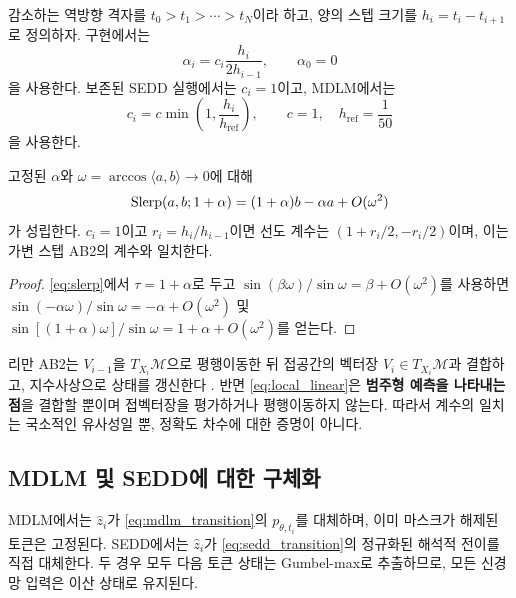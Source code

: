 감소하는 역방향 격자를 $t_0>t_1>\cdots>t_N$이라 하고, 양의 스텝 크기를
$h_i=t_i-t_{i+1}$로 정의하자. 구현에서는
\begin{equation}
  \alpha_i=c_i\frac{h_i}{2h_{i-1}},\qquad \alpha_0=0
  \label{eq:alpha}
\end{equation}
을 사용한다. 보존된 SEDD 실행에서는 $c_i=1$이고, MDLM에서는
\begin{equation}
  c_i=c\min\left(1,\frac{h_i}{h_{\mathrm{ref}}}\right),
  \qquad c=1,\quad h_{\mathrm{ref}}=\frac{1}{50}
  \label{eq:dynamic_damping}
\end{equation}
을 사용한다.

\begin{proposition}[국소 선형 형태]
고정된 $\alpha$와 $\omega=\arccos\langle a,b\rangle\rightarrow0$에 대해
\begin{equation}
  \operatorname{Slerp}(a,b;1+\alpha)
  =(1+\alpha)b-\alpha a+O(\omega^2)
  \label{eq:local_linear}
\end{equation}
가 성립한다. $c_i=1$이고 $r_i=h_i/h_{i-1}$이면 선도 계수는
$(1+r_i/2,-r_i/2)$이며, 이는 가변 스텝 AB2의 계수와 일치한다.
\end{proposition}

\begin{proof}
\cref{eq:slerp}에서 $\tau=1+\alpha$로 두고
$\sin(\beta\omega)/\sin\omega=\beta+O(\omega^2)$를 사용하면
$\sin(-\alpha\omega)/\sin\omega=-\alpha+O(\omega^2)$ 및
$\sin[(1+\alpha)\omega]/\sin\omega=1+\alpha+O(\omega^2)$를 얻는다.
\end{proof}

\begin{remark}[리만 AB2가 아닌 이유]
리만 AB2는 $V_{i-1}$을 $T_{X_i}\mathcal{M}$으로 평행이동한 뒤 접공간의 벡터장
$V_i\in T_{X_i}\mathcal{M}$과 결합하고, 지수사상으로 상태를 갱신한다
\citep{hairer2006geometric}. 반면 \cref{eq:local_linear}은 \textbf{범주형 예측을 나타내는 점}을
결합할 뿐이며 접벡터장을 평가하거나 평행이동하지 않는다. 따라서 계수의 일치는 국소적인 유사성일
뿐, 정확도 차수에 대한 증명이 아니다.
\end{remark}

\subsection{MDLM 및 SEDD에 대한 구체화}

MDLM에서는 $\widehat z_i$가 \cref{eq:mdlm_transition}의 $p_{\theta,t_i}$를 대체하며, 이미
마스크가 해제된 토큰은 고정된다. SEDD에서는 $\widehat z_i$가 \cref{eq:sedd_transition}의
정규화된 해석적 전이를 직접 대체한다. 두 경우 모두 다음 토큰 상태는 Gumbel-max로 추출하므로,
모든 신경망 입력은 이산 상태로 유지된다.

